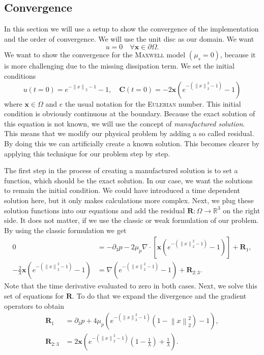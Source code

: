 \documentclass[12pt,a4paper,twoside, open=right]{scrreprt}
\theoremstyle{definition}
\theoremstyle{plain}
\newcommand{\rr}{\mathbb{R}}
\newcommand{\norm}[1]{\left\lVert#1\right\rVert}
\newcommand{\bfC}{\bm{C}}
\newcommand{\bfx}{\bm{x}}
\newcommand{\bfR}{\bm{R}}
\begin{document}
\subsection{Convergence}
In this section we will use a setup to show the convergence of the implementation and the order of convergence. We will use the unit disc as our domain. We want 
\begin{equation}
u = 0\quad\forall\bfx\in\partial\Omega.
\end{equation}
We want to show the convergence for the \textsc{Maxwell} model $(\mu_s=0)$, because it is more challenging due to the missing dissipation term.
We set the initial conditions
\begin{equation}
u(t=0) = e^{-\norm{x}_2-1}-1,
\quad\bfC(t=0) = -2\bfx(e^{-(\norm{x}_2^2 -1)}-1)
\end{equation}
where $\bfx\in\Omega$ and $e$ the usual notation for the \textsc{Eulerian} number. This initial condition is obviously continuous at the boundary. Because the exact solution of this equation is not known, we will use the concept of \emph{manufactured solution}. This means that we modify our physical problem by adding a so called residual. By doing this we can artificially create a known solution. This becomes clearer by applying this technique for our problem step by step.\par 
The first step in the process of creating a manufactured solution is to set a function, which should be the exact solution. In our case, we want the solutions to remain the initial condition. We could have introduced a time dependent solution here, but it only makes calculations more complex. Next, we plug these solution functions into our equations and add the residual $\bfR\colon\Omega\to\rr^3$ on the right side. It does not matter, if we use the classic or weak formulation of our problem. By using the classic formulation we get
\begin{align}
0 &= -\partial_3 p-2\mu_p \nabla\cdot [\bfx(e^{-(\norm{x}_2^2 -1)}-1)] +\bfR_1,\\
-\frac{2}{\lambda}\bfx(e^{-(\norm{x}_2^2 -1)}-1)&= \nabla (e^{-(\norm{x}_2^2 -1)}-1) +\bfR_{2:3}.
\end{align}
Note that the time derivative evaluated to zero in both cases. Next, we solve this set of equations for $\bfR$. To do that we expand the divergence and the gradient operators to obtain
\begin{align}
\bfR_1 &= \partial_3 p +4\mu_p(e^{-(\norm{x}_2^2 -1)}(1-\norm{x}_2^2)-1),\\
\bfR_{2:3} &=2\bfx\left(e^{-(\norm{x}_2^2 -1)}\left(1-\frac{1}{\lambda}\right)+\frac{1}{\lambda}\right).
\end{align}
\end{document}
